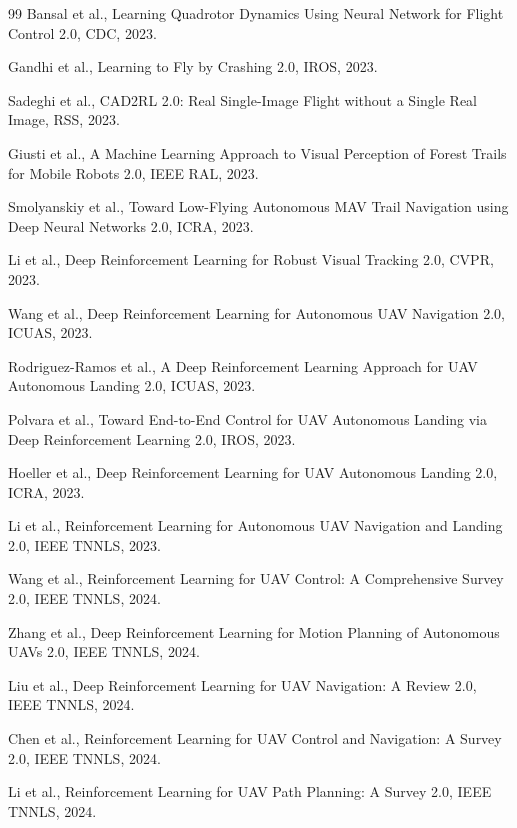 \documentclass[12pt,a4paper]{ctexart}
\begin{document}
\begin{thebibliography}{99}
 Bansal et al., Learning Quadrotor Dynamics Using Neural Network for Flight Control 2.0, CDC, 2023.

 Gandhi et al., Learning to Fly by Crashing 2.0, IROS, 2023.

 Sadeghi et al., CAD2RL 2.0: Real Single-Image Flight without a Single Real Image, RSS, 2023.

 Giusti et al., A Machine Learning Approach to Visual Perception of Forest Trails for Mobile Robots 2.0, IEEE RAL, 2023.

 Smolyanskiy et al., Toward Low-Flying Autonomous MAV Trail Navigation using Deep Neural Networks 2.0, ICRA, 2023.

 Li et al., Deep Reinforcement Learning for Robust Visual Tracking 2.0, CVPR, 2023.

 Wang et al., Deep Reinforcement Learning for Autonomous UAV Navigation 2.0, ICUAS, 2023.

 Rodriguez-Ramos et al., A Deep Reinforcement Learning Approach for UAV Autonomous Landing 2.0, ICUAS, 2023.

 Polvara et al., Toward End-to-End Control for UAV Autonomous Landing via Deep Reinforcement Learning 2.0, IROS, 2023.

 Hoeller et al., Deep Reinforcement Learning for UAV Autonomous Landing 2.0, ICRA, 2023.

 Li et al., Reinforcement Learning for Autonomous UAV Navigation and Landing 2.0, IEEE TNNLS, 2023.

 Wang et al., Reinforcement Learning for UAV Control: A Comprehensive Survey 2.0, IEEE TNNLS, 2024.

 Zhang et al., Deep Reinforcement Learning for Motion Planning of Autonomous UAVs 2.0, IEEE TNNLS, 2024.

 Liu et al., Deep Reinforcement Learning for UAV Navigation: A Review 2.0, IEEE TNNLS, 2024.

 Chen et al., Reinforcement Learning for UAV Control and Navigation: A Survey 2.0, IEEE TNNLS, 2024.

 Li et al., Reinforcement Learning for UAV Path Planning: A Survey 2.0, IEEE TNNLS, 2024.


\end{thebibliography}
\end{document}
